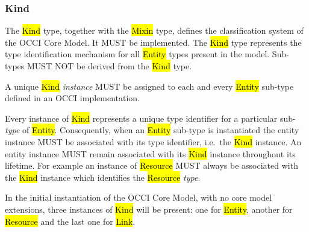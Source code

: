 \documentclass[10pt,a4paper]{article}
\begin{document}
\subsubsection{Kind}
\label{sec:kind}

The \hl{Kind} type, together with the \hl{Mixin} type, defines the
classification system of the OCCI Core Model. It MUST be
implemented. The \hl{Kind} type represents the type identification
mechanism for all \hl{Entity} types present in the model.
%
Sub-types MUST NOT be derived from the \hl{Kind} type.

A unique \hl{Kind} {\em instance} MUST be assigned to each and every
\hl{Entity} sub-type defined in an OCCI implementation.

Every instance of \hl{Kind} represents a unique type identifier for a
particular sub-{\em type} of \hl{Entity}.  Consequently, when an \hl{Entity}
sub-type is instantiated the entity instance MUST be associated with
its type identifier, i.e.~the \hl{Kind} instance.  An entity instance
MUST remain associated with its \hl{Kind} instance throughout its
lifetime.
%
For example an instance of \hl{Resource} MUST always be associated
with the \hl{Kind} instance which identifies the \hl{Resource} {\em type}.

In the initial instantiation of the OCCI Core Model, with no core
model extensions, three instances of \hl{Kind} will be present: one
for \hl{Entity}, another for \hl{Resource} and the last one for
\hl{Link}.

\end{document}
